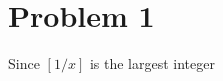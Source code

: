 \documentclass[a4paper]{report}
\begin{document}
\section*{Problem 1}
Since $[1/x]$ is the largest integer 
\end{document}
